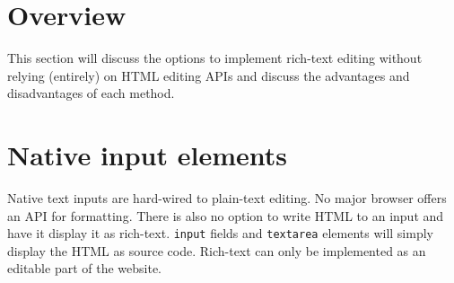 


\section{Overview}
\label{sec:rich_text_approaches}



This section will discuss the options to implement rich-text editing without relying (entirely) on HTML editing APIs and discuss the advantages and disadvantages of each method. %

\section{Native input elements} Native text inputs are hard-wired to plain-text editing. No major browser offers an API for formatting. There is also no option to write HTML to an input and have it display it as rich-text. \texttt{input} fields and \texttt{textarea} elements will simply display the HTML as source code. Rich-text can only be implemented as an editable part of the website.

